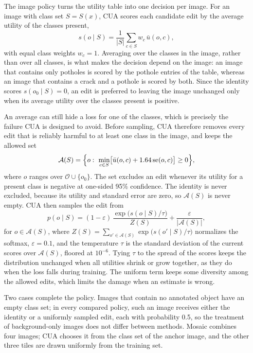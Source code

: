 \documentclass[conference]{IEEEtran}
\begin{document}
The image policy turns the utility table into one decision per image. For an image with class set $S=S(x)$, CUA scores each candidate edit by the average utility of the classes present,
\begin{equation}
s(o\mid S)=\frac{1}{|S|}\sum_{c\in S}w_c\,\bar u(o,c),
\label{eq:score}
\end{equation}
with equal class weights $w_c=1$. Averaging over the classes in the image, rather than over all classes, is what makes the decision depend on the image: an image that contains only potholes is scored by the pothole entries of the table, whereas an image that contains a crack and a pothole is scored by both. Since the identity scores $s(o_0\mid S)=0$, an edit is preferred to leaving the image unchanged only when its average utility over the classes present is positive.

An average can still hide a loss for one of the classes, which is precisely the failure CUA is designed to avoid. Before sampling, CUA therefore removes every edit that is reliably harmful to at least one class in the image, and keeps the allowed set
\begin{equation}
\mathcal{A}(S)=\Bigl\{o:\ \min_{c\in S}\bigl[\bar u(o,c)+1.64\,\mathrm{se}(o,c)\bigr]\geq 0\Bigr\},
\label{eq:harm}
\end{equation}
where $o$ ranges over $\mathcal{O}\cup\{o_0\}$. The set excludes an edit whenever its utility for a present class is negative at one-sided 95\% confidence. The identity is never excluded, because its utility and standard error are zero, so $\mathcal{A}(S)$ is never empty. CUA then samples the edit from
\begin{equation}
p(o\mid S)=(1-\varepsilon)\,\frac{\exp\bigl(s(o\mid S)/\tau\bigr)}{Z(S)}+\frac{\varepsilon}{|\mathcal{A}(S)|},
\label{eq:sampling}
\end{equation}
for $o\in\mathcal{A}(S)$, where $Z(S)=\sum_{o'\in\mathcal{A}(S)}\exp\bigl(s(o'\mid S)/\tau\bigr)$ normalizes the softmax, $\varepsilon=0.1$, and the temperature $\tau$ is the standard deviation of the current scores over $\mathcal{A}(S)$, floored at $10^{-6}$. Tying $\tau$ to the spread of the scores keeps the distribution unchanged when all utilities shrink or grow together, as they do when the loss falls during training. The uniform term keeps some diversity among the allowed edits, which limits the damage when an estimate is wrong.

Two cases complete the policy. Images that contain no annotated object have an empty class set; in every compared policy, such an image receives either the identity or a uniformly sampled edit, each with probability 0.5, so the treatment of background-only images does not differ between methods. Mosaic combines four images; CUA chooses it from the class set of the anchor image, and the other three tiles are drawn uniformly from the training set.
\end{document}
